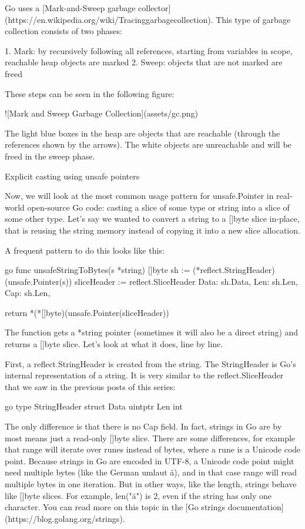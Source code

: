 Go uses a [Mark-and-Sweep garbage collector](https://en.wikipedia.org/wiki/Tracinggarbagecollection). This type of
garbage collection consists of two phases:

 1. Mark: by recursively following all references, starting from variables in scope, reachable heap objects are marked
 2. Sweep: objects that are not marked are freed

These steps can be seen in the following figure:

![Mark and Sweep Garbage Collection](assets/gc.png)

The light blue boxes in the heap are objects that are reachable (through the references shown by the arrows). The white
objects are unreachable and will be freed in the sweep phase.


 Explicit casting using unsafe pointers

Now, we will look at the most common usage pattern for unsafe.Pointer in real-world open-source Go code: casting a
slice of some type or string into a slice of some other type. Let's say we wanted to convert a string to a []byte
slice in-place, that is reusing the string memory instead of copying it into a new slice allocation.

A frequent pattern to do this looks like this:

go
func unsafeStringToBytes(s *string) []byte 
	sh := (*reflect.StringHeader)(unsafe.Pointer(s))
	sliceHeader := reflect.SliceHeader
		Data: sh.Data,
		Len:  sh.Len,
		Cap:  sh.Len,
	
	return *(*[]byte)(unsafe.Pointer(sliceHeader))



The function gets a *string pointer (sometimes it will also be a direct string) and returns a []byte slice. Let's
look at what it does, line by line.

First, a reflect.StringHeader is created from the string. The StringHeader is Go's internal representation of a
string. It is very similar to the reflect.SliceHeader that we saw in the previous posts of this series:

go
type StringHeader struct 
    Data uintptr
    Len  int



The only difference is that there is no Cap field. In fact, strings in Go are by most means just a read-only []byte
slice. There are some differences, for example that range will iterate over runes instead of bytes, where a rune is
a Unicode code point. Because strings in Go are encoded in UTF-8, a Unicode code point might need multiple bytes (like
the German umlaut ä), and in that case range will read multiple bytes in one iteration. But in other ways, like the
length, strings behave like []byte slices. For example, len("ä") is 2, even if the string has only one character.
You can read more on this topic in the [Go strings documentation](https://blog.golang.org/strings).

